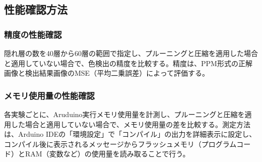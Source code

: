\documentclass[uplatex,dvipdfmx]{jsarticle}
\begin{document}
\subsection{性能確認方法}
\subsubsection{精度の性能確認}
隠れ層の数を40層から60層の範囲で指定し、プルーニングと圧縮を適用した場合と適用していない場合で、色検出の精度を比較する。精度は、PPM形式の正解画像と検出結果画像のMSE（平均二乗誤差）によって評価する。
\subsubsection{メモリ使用量の性能確認}
各実験ごとに、Aruduino実行メモリ使用量を計測し、プルーニングと圧縮を適用した場合と適用していない場合で、メモリ使用量の差を比較する。測定方法は、Arduino IDEの「環境設定」で「コンパイル」の出力を詳細表示に設定し、コンパイル後に表示されるメッセージからフラッシュメモリ（プログラムコード）とRAM（変数など）の使用量を読み取ることで行う。
\end{document}
